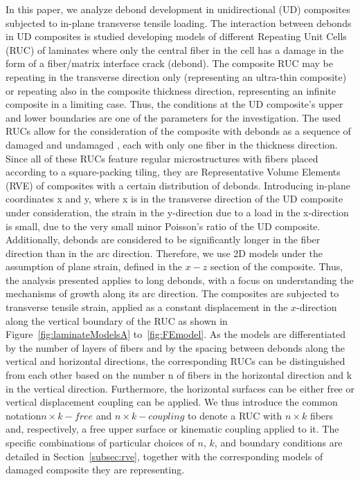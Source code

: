 \documentclass[review]{elsarticle}
\begin{document}
In this paper, we analyze debond development in unidirectional (UD) composites subjected to in-plane transverse tensile loading.  The interaction between debonds in UD composites is studied developing models of different Repeating Unit Cells (RUC) of laminates where only the central fiber in the cell has a damage in the form of a fiber/matrix interface crack (debond). The composite RUC may be repeating in the transverse direction only (representing an ultra-thin composite) or repeating also in the composite thickness direction, representing an infinite composite in a limiting case. Thus, the conditions at the UD composite's upper and lower boundaries are one of the parameters for the investigation.  The used RUCs allow for the consideration of the composite with debonds as a sequence of damaged and undamaged , each  with only one fiber in the thickness direction. Since all of these RUCs feature regular microstructures with fibers placed according to a square-packing tiling, they are Representative Volume Elements (RVE) of composites with a certain distribution of debonds. Introducing in-plane coordinates x and y, where x is in the transverse direction of the UD composite under consideration, the strain in the y-direction due to a load in the x-direction is small, due to the very small minor Poisson’s ratio of the UD composite. Additionally, debonds are considered to be significantly longer in the fiber direction than in the arc direction. Therefore, we use 2D models under the assumption of plane strain, defined in the $x-z$ section of the composite.  Thus, the analysis presented applies to long debonds, with a focus on understanding the mechanisms of growth along its arc direction. The composites are subjected to transverse tensile strain, applied as a constant displacement in the $x$-direction along the vertical boundary of the RUC as shown in  Figure~\ref{fig:laminateModelsA} to~\ref{fig:FEmodel}. As the models are differentiated by the number of layers of fibers and by the spacing between debonds along the vertical and horizontal directions, the corresponding RUCs can be distinguished from each other based on the number n of fibers in the horizontal direction and k in the vertical direction. Furthermore, the horizontal surfaces can be either free or vertical displacement coupling can be applied. We thus introduce the common notation$n\times k-free$  and $n\times k-coupling$ to denote a RUC with $n\times k$ fibers and, respectively, a free upper surface or kinematic coupling applied to it. The specific combinations of particular choices of $n$, $k$, and boundary conditions are detailed in Section~\ref{subsec:rve}, together with the corresponding models of damaged composite they are representing.
\end{document}
